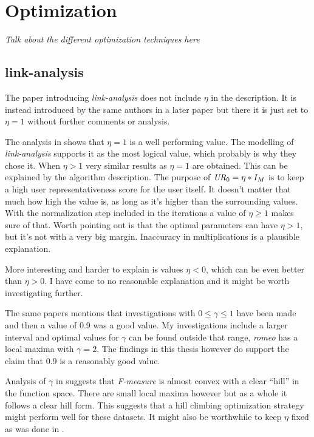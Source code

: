 \section{Optimization}

\textit{Talk about the different optimization techniques here}

\subsection{link-analysis}

The paper introducing \textit{link-analysis} \cite{huang2004link} does not include $\eta$ in the description. It is instead introduced by the same authors in a later paper \cite{huang2007comparison} but there it is just set to $\eta = 1$ without further comments or analysis.

The analysis in  shows that $\eta = 1$ is a well performing value. The modelling of \textit{link-analysis} supports it as the most logical value, which probably is why they chose it. When $\eta > 1$ very similar results as $\eta = 1$ are obtained. This can be explained by the algorithm description. The purpose of $\mathit{UR}_0 = \eta * I_M$ is to keep a high user representativeness score for the user itself. It doesn't matter that much how high the value is, as long as it's higher than the surrounding values. With the normalization step included in the iterations a value of $\eta \geq 1$ makes sure of that. Worth pointing out is that the optimal parameters can have $\eta > 1$, but it's not with a very big margin. Inaccuracy in multiplications is a plausible explanation.

More interesting and harder to explain is values $\eta < 0$, which can be even better than $\eta > 0$. I have come to no reasonable explanation and it might be worth investigating further.

The same papers \cite{huang2004link, huang2007comparison} mentions that investigations with $0 \leq \gamma \leq 1$ have been made and then a value of 0.9 was a good value. My investigations include a larger interval and optimal values for $\gamma$ can be found outside that range, \textit{romeo} has a local maxima with $\gamma = 2$. The findings in this thesis however do support the claim that 0.9 is a reasonably good value.

Analysis of $\gamma$ in  suggests that \textit{F-measure} is almost convex with a clear ``hill'' in the function space. There are small local maxima however but as a whole it follows a clear hill form. This suggests that a hill climbing optimization strategy might perform well for these datasets. It might also be worthwhile to keep $\eta$ fixed as was done in \cite{huang2004link, huang2007comparison}.

